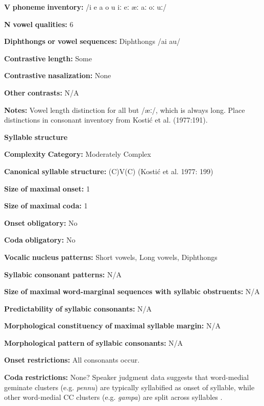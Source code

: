 \textbf{V} \textbf{phoneme} \textbf{inventory:} /i e a o u iː eː æː aː oː uː/

\textbf{N} \textbf{vowel} \textbf{qualities:} 6

\textbf{Diphthongs} \textbf{or} \textbf{vowel} \textbf{sequences:} Diphthongs /ai au/

\textbf{Contrastive} \textbf{length:} Some

\textbf{Contrastive} \textbf{nasalization:} None

\textbf{Other} \textbf{contrasts:} N/A

\textbf{Notes:} Vowel length distinction for all but /æː/, which is always long. Place distinctions in consonant inventory from Kostić et al. (1977:191).

\textbf{Syllable} \textbf{structure}

\textbf{Complexity} \textbf{Category:} Moderately Complex

\textbf{Canonical} \textbf{syllable} \textbf{structure:} (C)V(C) (Kostić et al. 1977: 199)

\textbf{Size} \textbf{of} \textbf{maximal} \textbf{onset:} 1

\textbf{Size} \textbf{of} \textbf{maximal} \textbf{coda:} 1

\textbf{Onset} \textbf{obligatory:} No

\textbf{Coda} \textbf{obligatory:} No

\textbf{Vocalic} \textbf{nucleus} \textbf{patterns:} Short vowels, Long vowels, Diphthongs

\textbf{Syllabic} \textbf{consonant} \textbf{patterns:} N/A

\textbf{Size} \textbf{of} \textbf{maximal} \textbf{word{}-marginal sequences with syllabic obstruents:} N/A

\textbf{Predictability} \textbf{of} \textbf{syllabic} \textbf{consonants:} N/A

\textbf{Morphological} \textbf{constituency} \textbf{of} \textbf{maximal} \textbf{syllable} \textbf{margin:} N/A

\textbf{Morphological} \textbf{pattern} \textbf{of} \textbf{syllabic} \textbf{consonants:} N/A

\textbf{Onset} \textbf{restrictions:} All consonants occur. 

\textbf{Coda} \textbf{restrictions:} None? Speaker judgment data suggests that word-medial geminate clusters (e.g. \textit{pennu}) are typically syllabified as onset of syllable, while other word-medial CC clusters (e.g. \textit{gampa}) are split across syllables \citep{Sailaja1999}.

